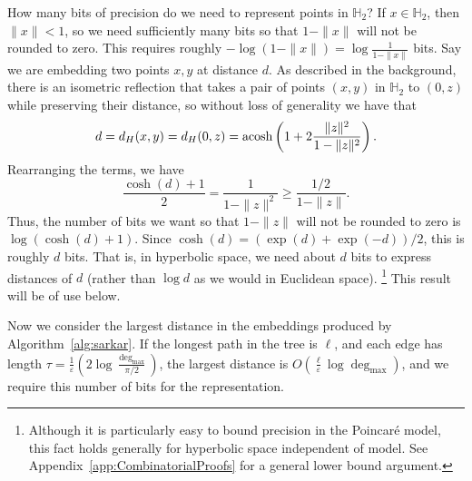
How many bits of precision do we need to represent points in
$\mathbb{H}_2$? If $x \in \mathbb{H}_2$, then $\|x \| < 1$, so we need
sufficiently many bits so that $1 - \|x\|$ will not be rounded to zero. This requires
roughly $-\log (1-\|x\|) = \log \frac{1}{1-\|x\|}$ bits.  Say we are
embedding two points $x,y$ at distance $d$. As described in the
background, there is an isometric reflection that takes a pair of points $(x,y)$
in $\mathbb{H}_2$ to $(0,z)$ while preserving their distance, so
without loss of generality we have that
\[ d = d_H(x, y) = d_H(0,z) = \operatorname{acosh} \left(1+2\frac{\|z\|^2}{1-\|z\|^2} \right). \]
Rearranging the terms, we have \[\frac{\cosh(d)+1}{2} = \frac{1}{1-\|z\|^2} \ge \frac{1/2}{1-\|z\|}.\] Thus, the number of bits we want so that $1 - \|z\|$ will not be rounded to zero is $\log ( \cosh(d)+1)$. Since $\cosh(d) = (\exp(d)+\exp(-d))/2$, this is roughly $d$ bits.
That is, in hyperbolic space, we need about $d$ bits to express distances of $d$ (rather than $\log d$ as we would in Euclidean space).%
\footnote{Although it is particularly easy to bound precision in the Poincar{\'e} model, this fact holds generally for hyperbolic space independent of model. See Appendix~\ref{app:CombinatorialProofs} for a general lower bound argument.}
This result will be of use below.

Now we consider the largest distance in the embeddings produced by Algorithm~\ref{alg:sarkar}. If the longest path in the tree is $\ell$, and each edge has length $\tau = \frac{1}{\varepsilon}\left(2\log \frac{\operatorname{deg}_{\text{max}}}{\pi /2}\right)$, the largest distance is $O(\frac{\ell}{\varepsilon}\log \operatorname{deg}_{\text{max}})$, and we require this number of bits for the representation.

